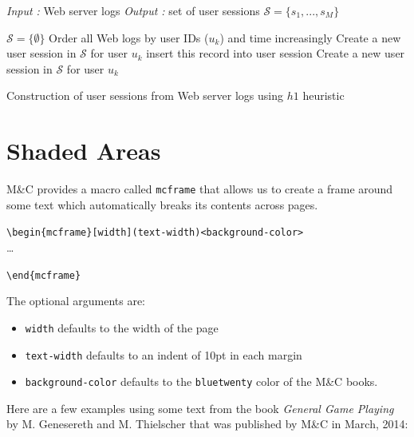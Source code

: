 \documentclass{book}\usepackage[]{graphicx}\usepackage[]{color}
\begin{document}
\begin{algorithm}
\hrulefill

 \textit{Input :} Web server logs \newline
 \textit {Output :} set of user sessions
$\mathcal{S}=\{s_{1},...,s_{M}\}$

\hrulefill

\begin{algorithmic}[1]
 \STATE $\mathcal{S}=\{\emptyset\}$
 \STATE Order all Web logs by user IDs ($u_k$) and time increasingly
    \STATE Create a new user session in $\mathcal{S}$ for user $u_k$
    		\STATE insert this record into user session
    	\ELSE
    		\STATE Create a new user session in $\mathcal{S}$ for user $u_k$
    	\ENDIF
    \ENDFOR
 \ENDFOR
\end{algorithmic}
\hrulefill
 \caption{Construction of user sessions from Web server logs using $h1$
 heuristic}
\label{alg:visitingTimeAlg}
\end{algorithm}

\clearpage

    


\chapter{Shaded Areas}
\label{ch04}

M\&C provides a macro called \verb+mcframe+ that allows us to
create a frame around some text which automatically breaks its contents
across pages. 

\verb+\begin{mcframe}[width](text-width)<background-color>+\\

\ldots

\verb+\end{mcframe}+

The optional arguments are:
\begin{itemize}
\item
\verb+width+ defaults to the width of the page
\item
\verb+text-width+ defaults to an indent of 10pt in each margin
\item
\verb+background-color+ defaults to the \verb+bluetwenty+ color of the
	M\&C books.
\end{itemize}

\blankline
Here are a few examples using some text from the book \textit{General Game 
Playing} by M. Genesereth and M. Thielscher that was published by M\&C in 
March, 2014:
\end{document}

